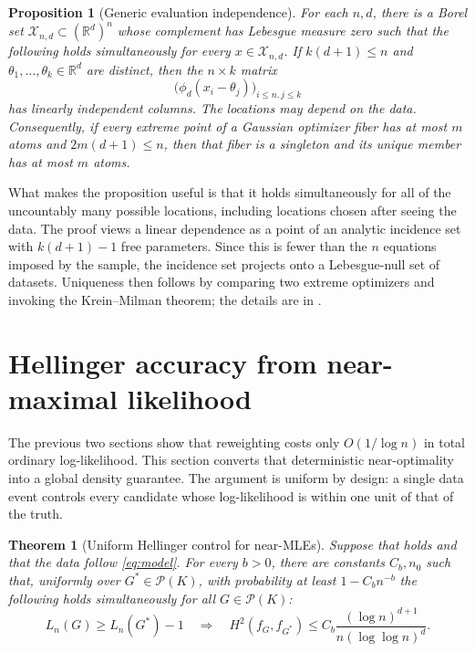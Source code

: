 \documentclass[11pt]{article}
\newtheorem{theorem}{Theorem}
\newtheorem{proposition}{Proposition}
\theoremstyle{definition}
\theoremstyle{remark}
\newcommand{\Pcal}{\mathcal P}
\newcommand{\RR}{\mathbb R}
\begin{document}
\begin{proposition}[Generic evaluation independence]
\label{prop:generic}
For each $n,d$, there is a Borel set $\mathcal X_{n,d}\subset(\RR^d)^n$ whose
complement has Lebesgue measure zero such that the following holds
simultaneously for every $x\in\mathcal X_{n,d}$.  If
$k(d+1)\le n$ and $\theta_1,\ldots,\theta_k\in\RR^d$ are distinct, then the
$n\times k$ matrix
\begin{equation}\label{eq:evaluation-matrix}
 \bigl(\phi_d(x_i-\theta_j)\bigr)_{i\le n,j\le k}
\end{equation}
has linearly independent columns.  The locations may depend on the data.
Consequently, if every extreme point of a Gaussian optimizer fiber has at
most $m$ atoms and $2m(d+1)\le n$, then that fiber is a singleton and its
unique member has at most $m$ atoms.
\end{proposition}

What makes the proposition useful is that it holds simultaneously for all of
the uncountably many possible locations, including locations chosen after
seeing the data.  The proof views a linear dependence as a point of an
analytic incidence set with $k(d+1)-1$ free parameters.  Since this is fewer
than the $n$ equations imposed by the sample, the incidence set projects onto
a Lebesgue-null set of datasets.  Uniqueness then follows by comparing two
extreme optimizers and invoking the Krein--Milman theorem; the details are in
.

\section{Hellinger accuracy from near-maximal likelihood}
\label{sec:hellinger}

The previous two sections show that reweighting costs only $O(1/\log n)$ in
total ordinary log-likelihood.  This section converts that deterministic
near-optimality into a global density guarantee.  The argument is uniform by
design: a single data event controls every candidate whose log-likelihood is
within one unit of that of the truth.

\begin{theorem}[Uniform Hellinger control for near-MLEs]
\label{thm:near-mle}
Suppose that  holds and that the data follow
\eqref{eq:model}.  For every $b>0$, there are constants $C_b,n_0$ such that, uniformly over
$G^*\in\Pcal(K)$, with probability at least $1-C_bn^{-b}$ the following
holds simultaneously for all $G\in\Pcal(K)$:
\begin{equation}\label{eq:near-truth}
 L_n(G)\ge L_n(G^*)-1
 \quad\Longrightarrow\quad
 H^2(f_G,f_{G^*})
 \le C_b\frac{(\log n)^{d+1}}
 {n(\log\log n)^d}.
\end{equation}
\end{theorem}
\end{document}
